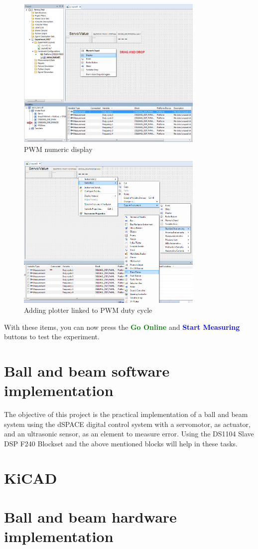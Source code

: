     \begin{figure}[H]
        \centering
        \includegraphics[width=0.8\textwidth]{Images/Ball and Bean/ControlDesk/CD12.png}
        \caption{PWM numeric display}
        \label{fig35}
    \end{figure}
    \begin{figure}[H]
        \centering
        \includegraphics[width=0.8\textwidth]{Images/Ball and Bean/ControlDesk/CD13.png}
        \caption{Adding plotter linked to PWM duty cycle}
        \label{fig36}
    \end{figure}
With these items, you can now press the \textcolor{green}{\textbf{Go Online}} and \textcolor{blue}{\textbf{Start Measuring}} buttons to test the experiment.

\newpage

\section{Ball and beam software implementation}
The objective of this project is the practical implementation of a ball and beam system using the dSPACE digital control system with a servomotor, as actuator, and an ultrasonic sensor, as an element to measure error. 
Using the DS1104 Slave DSP F240 Blockset and the above mentioned blocks will help in these tasks.\par
\section{KiCAD}

\section{Ball and beam hardware implementation}